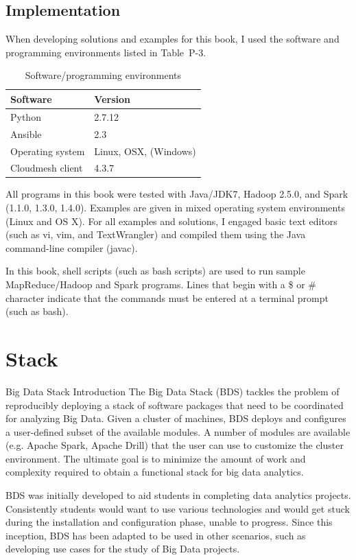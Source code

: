 \subsection{Implementation}

When developing solutions and examples for this book, I used the software and programming 
environments listed in Table~P-3.

\begin{table}[htb]
\caption{Software/programming environments}
\begin{center}
\begin{tabular}{|l|l|}
\hline
\textbf{Software} & \textbf{Version}\tabularnewline
\hline
Python &2.7.12\tabularnewline
\hline
Ansible & 2.3 \tabularnewline
\hline
Operating system& Linux, OSX, (Windows)\tabularnewline
\hline
Cloudmesh client &  4.3.7 \tabularnewline
\hline
\end{tabular}
\end{center}
\end{table}

All programs in this book were tested with Java/JDK7, Hadoop 2.5.0, and Spark (1.1.0, 
1.3.0, 1.4.0). Examples are given in mixed operating system environments (Linux 
and OS X). For all examples and solutions, I engaged basic text editors (such as 
vi, vim, and TextWrangler) and compiled them using the Java command-line compiler 
(javac).


In this book, shell scripts (such as bash scripts) are used to run sample MapReduce/Hadoop 
and Spark programs. Lines that begin with a \$ or \# character indicate that the 
commands must be entered at a terminal prompt (such as bash).

\section{Stack}


Big Data Stack
Introduction
The Big Data Stack (BDS) tackles the problem of reproducibly deploying a stack of software packages that need to be coordinated for analyzing Big Data. Given a cluster of machines, BDS deploys and configures a user-defined subset of the available modules. A number of modules are available (e.g. Apache Spark, Apache Drill) that the user can use to customize the cluster environment. The ultimate goal is to minimize the amount of work and complexity required to obtain a functional stack for big data analytics.

BDS was initially developed to aid students in completing data analytics projects. Consistently students would want to use various technologies and would get stuck during the installation and configuration phase, unable to progress. Since this inception, BDS has been adapted to be used in other scenarios, such as developing use cases for the study of Big Data projects.


